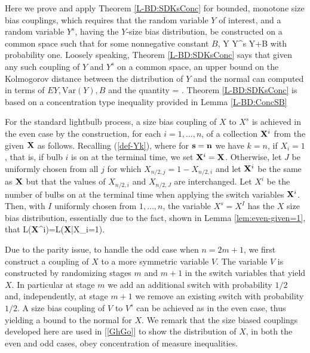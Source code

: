 \documentclass[10pt, amstex]{article}
\begin{document}
Here we prove and apply Theorem \ref{L-BD:SDKsConc} for bounded, monotone size
bias couplings, which
requires that the random variable $Y$ of interest, and a random variable $Y^s$, having the $Y$-size bias distribution, be constructed on a common space such that for some nonnegative constant $B$,
\beas
Y \le Y^s \le Y+B
\enas
with probability one.
Loosely speaking, Theorem \ref{L-BD:SDKsConc} says that
 given any such coupling of
$Y$ and $Y^s$ on a common space, an upper bound on the Kolmogorov
distance between the
distribution of $Y$ and the normal can computed in terms of $EY,\mbox{Var}(Y),B$ and
the quantity
\bea \label{def-Delta-int}
\Delta = .
\ena
Theorem \ref{L-BD:SDKsConc} is based on a concentration
type inequality provided in Lemma \ref{L-BD:ConcSB}

For the standard lightbulb process, a size bias coupling of $X$ to $X^s$ is achieved in the even case by the construction, for each $i=1,\ldots,n$, of a collection
${\bf X}^i$ from the given ${\bf X}$ as follows. Recalling (\ref{def-Yk}), where
for ${\bf s}={\bf n}$ we have $k=n$, if $X_i=1$, that is, if bulb $i$ is on
at the terminal time, we set ${\bf X}^i={\bf X}$. Otherwise,
let $J$ be uniformly chosen from all $j$ for which $X_{n/2,j}=1-X_{n/2,i}$ and
let ${\bf X}^i$ be the same as ${\bf X}$ but that the values of
$X_{n/2,i}$ and $X_{n/2,J}$ are interchanged. Let $X^i$ be the number of bulbs
on at the terminal time when applying the switch variables ${\bf X}^i$.
Then, with $I$ uniformly chosen from $1,\ldots,n$, the
variable $X^s=X^I$ has the $X$ size bias distribution, essentially due to the fact,
shown in Lemma \ref{lem:even-given=1}, that
\beas
{\cal L}({\bf X}^i)={\cal L}({\bf X}|X_i=1).
\enas

Due to the parity issue, to handle the odd case when $n=2m+1$, we
first construct a coupling of $X$ to a more symmetric variable $V$.
The variable $V$ is constructed by randomizing stages $m$ and $m+1$ in the switch variables that
yield $X$. In particular at stage $m$ we add an additional switch with probability $1/2$ and, independently, at stage $m+1$ we remove an existing switch with probability $1/2$.
A size bias coupling of $V$ to $V^s$ can be
achieved as in the even case, thus yielding a bound to the normal
for $X$. We remark that the size biased couplings developed here are
used in [\ref{GhGo}] to show the distribution of $X$, in both the even and odd cases,
obey concentration of measure inequalities.
\end{document}
